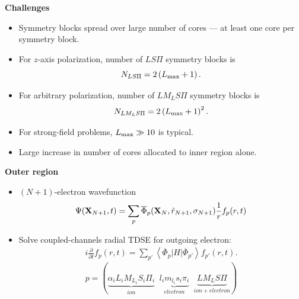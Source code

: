 \documentclass{fancyslides}
\newlength{\wideitemsep}
\let\olditem\item
\renewcommand{\item}{\setlength{\itemsep}{\wideitemsep}\olditem}
\newcommand{\nn}{\nonumber}
\begin{document}
\begin{frame}


\begin{center}
\bf\Large{Challenges}
\end{center}

\small
\begin{itemize}
\item Symmetry blocks spread over large number of cores --- at least one core per symmetry block.
\item For $z$-axis polarization, number of $LS\Pi$ symmetry blocks is
$$
N_{LS\Pi} = 2\left(L_{\rm max} + 1\right).
$$ 
\item For arbitrary polarization, number of $LM_LS\Pi$ symmetry blocks is
$$
N_{LM_LS\Pi} = 2\left(L_{\rm max} + 1\right)^2.
$$
\item For strong-field problems, $L_{\rm max} \gg 10$ is typical.
\item Large increase in number of cores allocated to inner region alone.
\end{itemize}

\end{frame}
%
\begin{frame}


\begin{center}
\bf\Large{Outer region}
\end{center}

\small
\begin{itemize}
\item $(N+1)$-electron wavefunction
$$
\small
\Psi({\bf X}_{N+1},t)
= 
\sum_p
\overline\Phi_p({\bf X}_N,{\hat r}_{N+1},\sigma_{N+1})
\frac{1}{r}f_p(r,t)
$$
\item Solve coupled-channels radial TDSE for outgoing electron:
\begin{align}
i\frac{\partial}{\partial t}f_p(r,t)
=
\sum_{p'}
\left\langle \overline\Phi_p|H|\overline\Phi_{p'}\right\rangle f_{p'}(r,t).
\nn
\end{align}
$$
p = (\underbrace{\alpha_i L_i M_{L_i}S_i\Pi_i}_{ion}  \;\; \underbrace {l_i m_{l_i}s_i\pi_i}_{electron}   \;\; 
\underbrace{ L M_{L}S\Pi}_{ion+electron})
$$
\end{itemize}

\end{frame}
\end{document}
